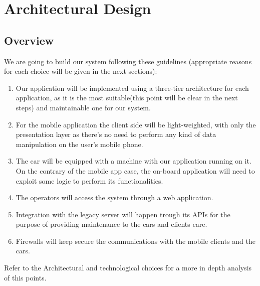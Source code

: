 \documentclass[]{article}
\begin{document}
\section{Architectural Design}\label{architectural-design}

\subsection{Overview}\label{overview}

We are going to build our system following these guidelines (appropriate
reasons for each choice will be given in the next sections):

\begin{enumerate}
\def\labelenumi{\arabic{enumi}.}
\item
  Our application will be implemented using a three-tier architecture
  for each application, as it is the most suitable(this point will be
  clear in the next steps) and maintainable one for our system.
\item
  For the mobile application the client side will be light-weighted,
  with only the presentation layer as there's no need to perform any
  kind of data manipulation on the user's mobile phone.
\item
  The car will be equipped with a machine with our application running
  on it. On the contrary of the mobile app case, the on-board
  application will need to exploit some logic to perform its
  functionalities.
\item
  The operators will access the system through a web application.
\item
  Integration with the legacy server will happen trough its APIs for the
  purpose of providing maintenance to the cars and clients care.
\item
  Firewalls will keep secure the communications with the mobile clients
  and the cars.
\end{enumerate}

Refer to the Architectural and technological choices for a more in depth
analysis of this points.
\end{document}
